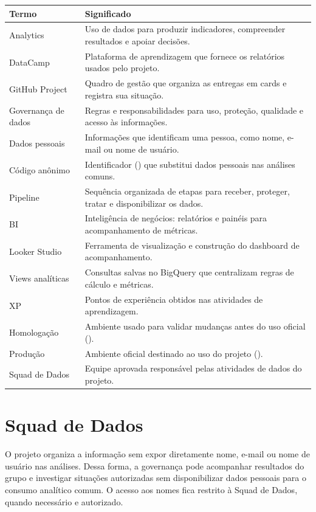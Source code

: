 \documentclass[11pt,a4paper]{article}
\begin{document}
\begin{longtable}{L{40mm}L{106mm}}
\toprule
\textbf{Termo} & \textbf{Significado} \\
\midrule
\endhead
Analytics & Uso de dados para produzir indicadores, compreender resultados e apoiar decisões. \\
DataCamp & Plataforma de aprendizagem que fornece os relatórios usados pelo projeto. \\
GitHub Project & Quadro de gestão que organiza as entregas em cards e registra sua situação. \\
Governança de dados & Regras e responsabilidades para uso, proteção, qualidade e acesso às informações. \\
Dados pessoais & Informações que identificam uma pessoa, como nome, e-mail ou nome de usuário. \\
Código anônimo & Identificador () que substitui dados pessoais nas análises comuns. \\
Pipeline & Sequência organizada de etapas para receber, proteger, tratar e disponibilizar os dados. \\
BI & Inteligência de negócios: relatórios e painéis para acompanhamento de métricas. \\
Looker Studio & Ferramenta de visualização e construção do dashboard de acompanhamento. \\
Views analíticas & Consultas salvas no BigQuery que centralizam regras de cálculo e métricas. \\
XP & Pontos de experiência obtidos nas atividades de aprendizagem. \\
Homologação & Ambiente usado para validar mudanças antes do uso oficial (). \\
Produção & Ambiente oficial destinado ao uso do projeto (). \\
Squad de Dados & Equipe aprovada responsável pelas atividades de dados do projeto. \\
\bottomrule
\end{longtable}

\section{Squad de Dados}

O projeto organiza a informação sem expor diretamente nome, e-mail ou nome de
usuário nas análises. Dessa forma, a governança pode acompanhar resultados do
grupo e investigar situações autorizadas sem disponibilizar dados pessoais para
o consumo analítico comum. O acesso aos nomes fica restrito à Squad de Dados,
quando necessário e autorizado.
\end{document}
